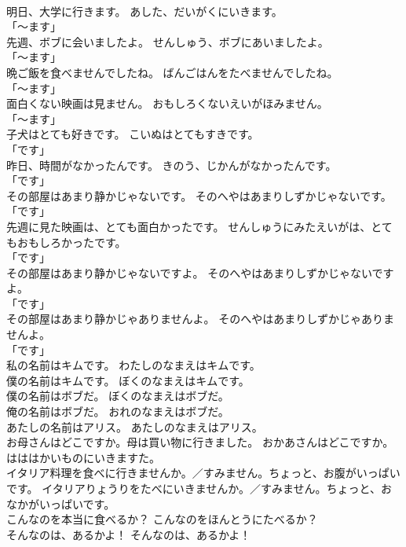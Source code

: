 \documentclass[8pt]{extreport}
\begin{document}
\begin{CJK}{UTF8}{min}
\\	明日、大学に行きます。	あした、だいがくにいきます。	
\\	「～ます」 
\\	先週、ボブに会いましたよ。	せんしゅう、ボブにあいましたよ。	
\\	「～ます」 
\\	晩ご飯を食べませんでしたね。	ばんごはんをたべませんでしたね。	
\\	「～ます」 
\\	面白くない映画は見ません。	おもしろくないえいがほみません。	
\\	「～ます」 
\\	子犬はとても好きです。	こいぬはとてもすきです。	
\\	「です」 
\\	昨日、時間がなかったんです。	きのう、じかんがなかったんです。	
\\	「です」 
\\	その部屋はあまり静かじゃないです。	そのへやはあまりしずかじゃないです。	
\\	「です」 
\\	先週に見た映画は、とても面白かったです。	せんしゅうにみたえいがは、とてもおもしろかったです。	
\\	「です」 
\\	その部屋はあまり静かじゃないですよ。	そのへやはあまりしずかじゃないですよ。	
\\	「です」 
\\	その部屋はあまり静かじゃありませんよ。	そのへやはあまりしずかじゃありませんよ。	
\\	「です」 
\\	私の名前はキムです。	わたしのなまえはキムです。	
\\	僕の名前はキムです。	ぼくのなまえはキムです。	
\\	僕の名前はボブだ。	ぼくのなまえはボブだ。	
\\	俺の名前はボブだ。	おれのなまえはボブだ。	
\\	あたしの名前はアリス。	あたしのなまえはアリス。	
\\	お母さんはどこですか。母は買い物に行きました。	おかあさんはどこですか。はははかいものにいきますた。	
\\	イタリア料理を食べに行きませんか。／すみません。ちょっと、お腹がいっぱいです。	イタリアりょうりをたべにいきませんか。／すみません。ちょっと、おなかがいっぱいです。	
\\	こんなのを本当に食べるか？	こんなのをほんとうにたべるか？	
\\	そんなのは、あるかよ！	そんなのは、あるかよ！	

\end{CJK}
\end{document}
